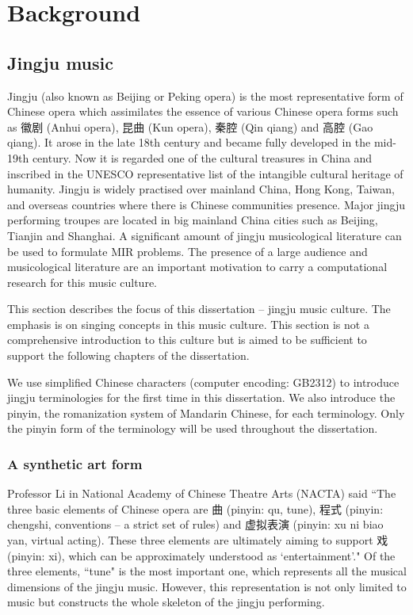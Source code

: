 \chapter{Background}\label{chap:bkgnd}

\section{Jingju music}
Jingju (also known as Beijing or Peking opera) is the most representative form of Chinese opera which assimilates the essence of various Chinese opera forms such as 徽剧 (Anhui opera), 昆曲 (Kun opera), 秦腔 (Qin qiang) and 高腔 (Gao qiang). It arose in the late 18th century and became fully developed in the mid-19th century. Now it is regarded one of the cultural treasures in China and inscribed in the UNESCO representative list of the intangible cultural heritage of humanity. Jingju is widely practised over mainland China, Hong Kong, Taiwan, and overseas countries where there is Chinese communities presence. Major jingju performing troupes are located in big mainland China cities such as Beijing, Tianjin and Shanghai. A significant amount of jingju musicological literature can be used to formulate MIR problems. The presence of a large audience and musicological literature are an important motivation to carry a computational research for this music culture.

This section describes the focus of this dissertation -- jingju music culture. The emphasis is on singing concepts in this music culture. This section is not a comprehensive introduction to this culture but is aimed to be sufficient to support the following chapters of the dissertation.

We use simplified Chinese characters (computer encoding: GB2312) to introduce jingju terminologies for the first time in this dissertation. We also introduce the pinyin, the romanization system of Mandarin Chinese, for each terminology. Only the pinyin form of the terminology will be used throughout the dissertation. 

\subsection{A synthetic art form}

Professor Li in National Academy of Chinese Theatre Arts (NACTA) said ``The three basic elements of Chinese opera are 曲 (pinyin: qu, tune), 程式 (pinyin: chengshi, conventions -- a strict set of rules) and 虚拟表演 (pinyin: xu ni biao yan, virtual acting). These three elements are ultimately aiming to support 戏 (pinyin: xi), which can be approximately understood as `entertainment'." Of the three elements, ``tune" is the most important one, which represents all the musical dimensions of the jingju music. However, this representation is not only limited to music but constructs the whole skeleton of the jingju performing.

